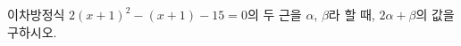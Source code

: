 이차방정식 $2(x+1)^2-(x+1)-15=0$의 두 근을 $\alpha$, $\beta$라 할 때, $2\alpha+\beta$의 값을 구하시오. \cond{$\alpha<\beta$}
